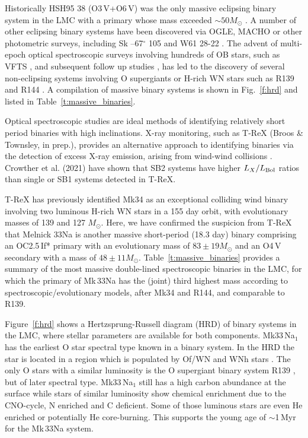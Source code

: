\documentclass[fleqn,usenatbib]{mnras}
\begin{document}
Historically HSH95 38 (O3\,V+O6\,V) was the only massive eclipsing binary system in the LMC with a primary whose mass exceeded $\sim 50 M_{\odot}$ \citep{massey2002}. A number of other eclipsing binary systems have been discovered via OGLE, MACHO or other photometric surveys, including Sk --67$^{\circ}$ 105 \citep{ostrov2003} and W61 28-22 \citep{bonanos2009}. The advent of multi-epoch optical spectroscopic surveys involving hundreds of OB stars, such as VFTS \citep{evans2011}, and subsequent follow up studies \citep[TMBM,][]{almeida2017}, has led to the discovery of several non-eclipsing systems involving O supergiants or H-rich WN stars such as R139 \citep{taylor2011, mahy2020} and R144 \citep{shenar2021}. A compilation of massive binary systems is shown in Fig.~\ref{f:hrd} and listed in Table~\ref{t:massive_binaries}.

Optical spectroscopic studies are ideal methods of identifying relatively short period binaries with high inclinations. X-ray monitoring, such as T-ReX (Broos \& Townsley, in prep.), provides an alternative approach to identifying binaries via the detection of excess X-ray emission, arising from wind-wind collisions \citep{pollock1987}. Crowther et al. (2021) have shown that SB2 systems have higher $L_{X}/L_{\rm Bol}$ ratios than single or SB1 systems detected in T-ReX.

T-ReX has previously identified Mk34 as an exceptional colliding wind binary involving two luminous H-rich WN stars in a 155 day orbit, with evolutionary masses of 139 and 127 $M_{\odot}$. Here, we have confirmed the suspicion from T-ReX that Melnick 33Na is another massive short-period (18.3 day) binary comprising an OC2.5\,If* primary with an evolutionary mass of  $83 \pm 19 M_{\odot}$ and an O4\,V secondary with a mass of $48 \pm 11 M_{\odot}$. Table~\ref{t:massive_binaries} provides a summary of the most massive double-lined spectroscopic binaries in the LMC, for which the primary of Mk\,33Na has the (joint) third highest mass according to spectroscopic/evolutionary models, after Mk34 and R144, and comparable to R139.

Figure~\ref{f:hrd} shows a Hertzsprung-Russell diagram (HRD) of binary systems in the LMC, where stellar parameters are available for both components. Mk33\,Na$_1$ has the earliest O star spectral type known in a binary system. In the HRD the star is located in a region which is populated by Of/WN and WNh stars \citep{shenar2017, tehrani2019, shenar2019, shenar2021}. The only O stars with a similar luminosity is the O supergiant binary system R139 \citep{taylor2011, mahy2020}, but of later spectral type. Mk33\,Na$_1$ still has a high carbon abundance at the surface while stars of similar luminosity show chemical enrichment due to the CNO-cycle, N enriched and C deficient. Some of those luminous stars are even He enriched or potentially He core-burning. This supports the young age of $\sim$1\,Myr for the Mk\,33Na system.
\end{document}

